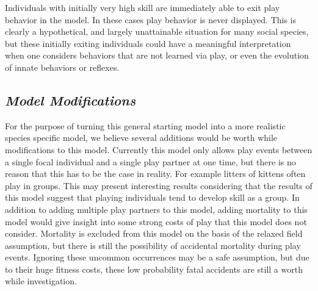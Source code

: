 \documentclass[12pt, letterpaper, fleqn]{article}
\begin{document}
      Individuals with initially very high skill are immediately able to exit play behavior in the model. 
      In these cases play behavior is never displayed.
      This is clearly a hypothetical, and largely unattainable situation for many social species, but these initially exiting individuals could have a meaningful interpretation when one considers behaviors that are not learned via play, or even the evolution of innate behaviors or reflexes. %

  
  \subsection*{\it Model Modifications}
      For the purpose of turning this general starting model into a more realistic species specific model, we believe several additions would be worth while modifications to this model. %
      Currently this model only allows play events between a single focal individual and a single play partner at one time, but there is no reason that this has to be the case in reality.
      For example litters of kittens often play in groups.
      This may present interesting results considering that the results of this model suggest that playing individuals tend to develop skill as a group. %
      In addition to adding multiple play partners to this model, adding mortality to this model would give insight into some strong costs of play that this model does not consider. %
      Mortality is excluded from this model on the basis of the relaxed field assumption, but there is still the possibility of accidental mortality during play events.
      Ignoring these uncommon occurrences may be a safe assumption, but due to their huge fitness costs, these low probability fatal accidents are still a worth while investigation.
    
\end{document}
